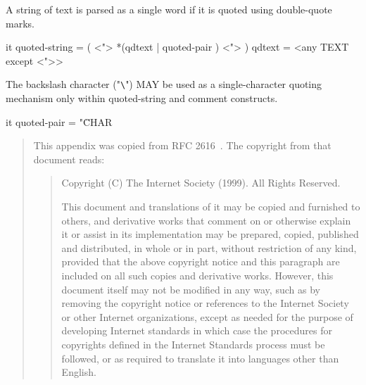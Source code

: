    A string of text is parsed as a single word if it is quoted using
   double-quote marks.

\begin{vcode}{it}
       quoted-string  = ( <"> *(qdtext | quoted-pair ) <"> )
       qdtext         = <any TEXT except <">>
\end{vcode}

   The backslash character ("\verb+\+") MAY be used as a single-character
   quoting mechanism only within quoted-string and comment constructs.

\begin{vcode}{it}
       quoted-pair    = "\" CHAR
\end{vcode}

\begin{quote}
This appendix was copied from RFC 2616~\cite{rfc2616}. The copyright
from that document reads:

\begin{quote}
  Copyright (C) The Internet Society (1999).  All Rights Reserved.

   This document and translations of it may be copied and furnished to
   others, and derivative works that comment on or otherwise explain it
   or assist in its implementation may be prepared, copied, published
   and distributed, in whole or in part, without restriction of any
   kind, provided that the above copyright notice and this paragraph are
   included on all such copies and derivative works.  However, this
   document itself may not be modified in any way, such as by removing
   the copyright notice or references to the Internet Society or other
   Internet organizations, except as needed for the purpose of
   developing Internet standards in which case the procedures for
   copyrights defined in the Internet Standards process must be
   followed, or as required to translate it into languages other than
   English.
\end{quote}

\end{quote}

